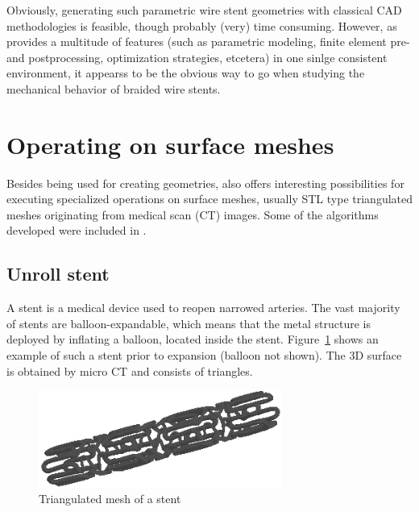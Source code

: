 

Obviously, generating such parametric wire stent geometries with classical CAD methodologies is feasible, though probably (very) time consuming. However, as \pyf provides a multitude of features (such as parametric modeling, finite element pre- and postprocessing, optimization strategies, etcetera) in one sinlge consistent environment, it appearss to be the obvious way to go when studying the mechanical behavior of braided wire stents.

\newpage

\section{Operating on surface meshes}
\label{sec:operating-surf-mesh}

Besides being used for creating geometries, \pyf also offers interesting possibilities for executing specialized operations on surface meshes, usually STL type triangulated meshes originating from medical scan (CT) images. Some of the algorithms developed were included in \pyf.

\subsection{Unroll stent}
\label{sec:unroll-stent}

A stent is a medical device used to reopen narrowed arteries. The vast majority of stents are balloon-expandable, which means that the metal structure is deployed by inflating a balloon, located inside the stent. Figure~\ref{fig:cypher-stent} shows an example of such a stent prior to expansion (balloon not shown). The 3D surface is obtained by micro CT and consists of triangles.

\begin{figure}[h]
  \centering
  \begin{makeimage}
  \end{makeimage}
  \begin{latexonly}
    \includegraphics[width=8cm]{images/cypher-stent}
  \end{latexonly}
  \begin{htmlonly}
  \end{htmlonly}  
  \caption{Triangulated mesh of a stent}
  \label{fig:cypher-stent}
\end{figure}

